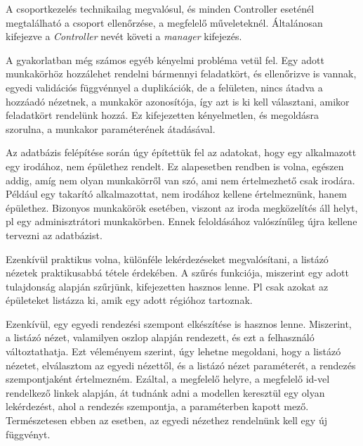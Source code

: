 \documentclass[a4paper,12pt]{article}
\begin{document}
A csoportkezelés technikailag megvalósul, és minden Controller eseténél megtalálható a csoport ellenőrzése, a megfelelő műveleteknél. Általánosan kifejezve a \textit{Controller} nevét követi a \textit{manager} kifejezés.

A gyakorlatban még számos egyéb kényelmi probléma vetül fel. Egy adott munkakörhöz hozzálehet rendelni bármennyi feladatkört, és ellenőrizve is vannak, egyedi validációs függvénnyel a duplikációk, de a felületen, nincs átadva a hozzáadó nézetnek, a munkakör azonosítója, így azt is ki kell választani, amikor feladatkört rendelünk hozzá. Ez kifejezetten kényelmetlen, és megoldásra szorulna, a munkakor paraméterének átadásával.

Az adatbázis felépítése során úgy építettük fel az adatokat, hogy egy alkalmazott egy irodához, nem épülethez rendelt. Ez alapesetben rendben is volna, egészen addig, amíg nem olyan munkakörről van szó, ami nem értelmezhető csak irodára. Például egy takarító alkalmazottat, nem irodához kellene értelmeznünk, hanem épülethez. Bizonyos munkakörök esetében, viszont az iroda megközelítés áll helyt, pl egy adminisztrátori munkakörben. Ennek feloldásához valószínűleg újra kellene tervezni az adatbázist.

Ezenkívül praktikus volna, különféle lekérdezéseket megvalósítani, a listázó nézetek praktikusabbá tétele érdekében. A szűrés funkciója, miszerint egy adott tulajdonság alapján szűrjünk, kifejezetten hasznos lenne. Pl csak azokat az épületeket listázza ki, amik egy adott régióhoz tartoznak.

Ezenkívül, egy egyedi rendezési szempont elkészítése is hasznos lenne. Miszerint, a listázó nézet, valamilyen oszlop alapján rendezett, és ezt a felhasználó változtathatja. Ezt véleményem szerint, úgy lehetne megoldani, hogy a listázó nézetet, elválasztom az egyedi nézettől, és a listázó nézet paraméterét, a rendezés szempontjaként értelmezném. Ezáltal, a megfelelő helyre, a megfelelő id-vel rendelkező linkek alapján, át tudnánk adni a modellen keresztül egy olyan lekérdezést, ahol a rendezés szempontja, a paraméterben kapott mező. Természetesen ebben az esetben, az egyedi nézethez rendelnünk kell egy új függvényt. 
\end{document}
